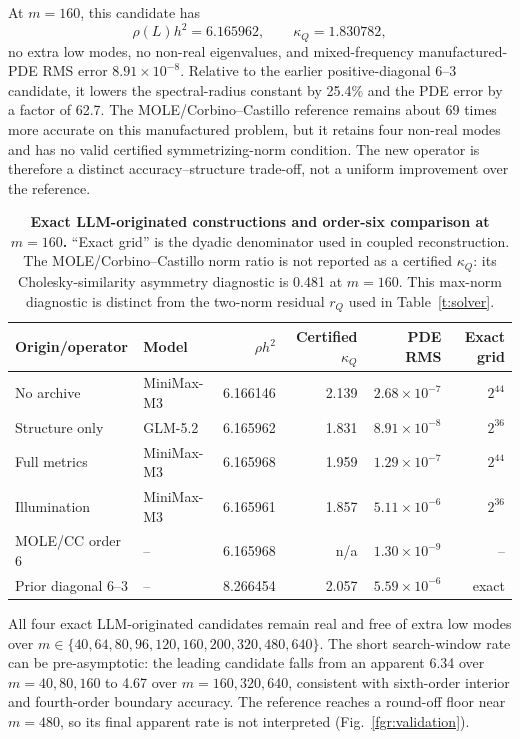 \documentclass[lineno,pdflatex,sn-nature]{sn-jnl}
\newcommand{\cond}{\kappa}
\theoremstyle{thmstyleone}
\begin{document}
At $m=160$, this candidate has
\begin{equation}
\rho(L)h^2=6.165962,\qquad \cond_Q=1.830782,
\end{equation}
no extra low modes, no non-real eigenvalues, and mixed-frequency manufactured-PDE RMS error $8.91\times10^{-8}$. Relative to the earlier positive-diagonal $6$--$3$ candidate, it lowers the spectral-radius constant by 25.4\% and the PDE error by a factor of 62.7. The MOLE/Corbino--Castillo reference remains about 69 times more accurate on this manufactured problem, but it retains four non-real modes and has no valid certified symmetrizing-norm condition. The new operator is therefore a distinct accuracy--structure trade-off, not a uniform improvement over the reference.

\begin{table}[!htbp]
\caption{\textbf{Exact LLM-originated constructions and order-six comparison at $m=160$.} ``Exact grid'' is the dyadic denominator used in coupled reconstruction. The MOLE/Corbino--Castillo norm ratio is not reported as a certified $\kappa_Q$: its Cholesky-similarity asymmetry diagnostic is 0.481 at $m=160$. This max-norm diagnostic is distinct from the two-norm residual $r_Q$ used in Table~\ref{t:solver}.}
\label{t:exact}
\centering
\small
\begin{tabular}{@{}llrrrr@{}}
\toprule
Origin/operator & Model & $\rho h^2$ & Certified $\kappa_Q$ & PDE RMS & Exact grid \\
\midrule
No archive & MiniMax-M3 & 6.166146 & 2.139 & $2.68\times10^{-7}$ & $2^{44}$ \\
Structure only & GLM-5.2 & 6.165962 & 1.831 & $8.91\times10^{-8}$ & $2^{36}$ \\
Full metrics & MiniMax-M3 & 6.165968 & 1.959 & $1.29\times10^{-7}$ & $2^{44}$ \\
Illumination & MiniMax-M3 & 6.165961 & 1.857 & $5.11\times10^{-6}$ & $2^{36}$ \\
\midrule
MOLE/CC order 6 & -- & 6.165968 & n/a & $1.30\times10^{-9}$ & -- \\
Prior diagonal $6$--$3$ & -- & 8.266454 & 2.057 & $5.59\times10^{-6}$ & exact \\
\bottomrule
\end{tabular}
\end{table}

All four exact LLM-originated candidates remain real and free of extra low modes over $m\in\{40,64,80,96,120,160,200,320,480,640\}$. The short search-window rate can be pre-asymptotic: the leading candidate falls from an apparent 6.34 over $m=40,80,160$ to 4.67 over $m=160,320,640$, consistent with sixth-order interior and fourth-order boundary accuracy. The reference reaches a round-off floor near $m=480$, so its final apparent rate is not interpreted (Fig.~\ref{fgr:validation}).
\end{document}
